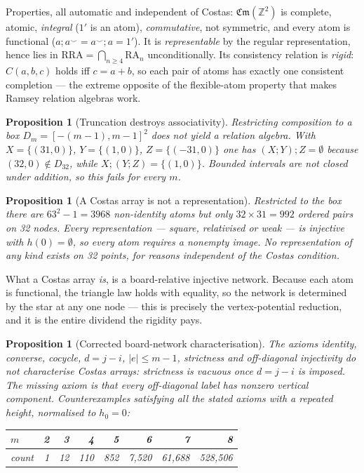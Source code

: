 \documentclass[11pt,a4paper]{article}
\newtheorem{proposition}[theorem]{Proposition}
\theoremstyle{definition}
\newcommand{\Z}{\mathbb{Z}}
\newcommand{\Cm}{\mathfrak{Cm}}
\newcommand{\RA}{\mathrm{RA}}
\newcommand{\RRA}{\mathrm{RRA}}
\begin{document}
Properties, all automatic and independent of Costas: $\Cm(\Z^2)$ is complete,
atomic, \emph{integral} ($1'$ is an atom), \emph{commutative}, not symmetric,
and every atom is functional ($a;a^\smile = a^\smile;a = 1'$). It is
\emph{representable} by the regular representation, hence lies in
$\RRA = \bigcap_{n\ge4}\RA_n$ unconditionally. Its consistency relation is
\emph{rigid}: $C(a,b,c)$ holds iff $c=a+b$, so each pair of atoms has exactly one
consistent completion --- the extreme opposite of the flexible-atom property that
makes Ramsey relation algebras work.

\begin{proposition}[Truncation destroys associativity]
Restricting composition to a box $D_m=[-(m-1),m-1]^2$ does not yield a relation
algebra. With $X=\{(31,0)\}$, $Y=\{(1,0)\}$, $Z=\{(-31,0)\}$ one has
$(X;Y);Z=\emptyset$ because $(32,0)\notin D_{32}$, while $X;(Y;Z)=\{(1,0)\}$.
Bounded intervals are not closed under addition, so this fails for every $m$.
\end{proposition}

\begin{proposition}[A Costas array is not a representation]
Restricted to the box there are $63^2-1 = 3968$ non-identity atoms but only
$32\times31 = 992$ ordered pairs on 32 nodes. Every representation --- square,
relativised or weak --- is injective with $h(0)=\emptyset$, so every atom
requires a nonempty image. No representation of any kind exists on 32 points,
for reasons independent of the Costas condition.
\end{proposition}

What a Costas array \emph{is}, is a board-relative injective network. Because
each atom is functional, the triangle law holds with equality, so the network is
determined by the star at any one node --- this is precisely the vertex-potential
reduction, and it is the entire dividend the rigidity pays.

\begin{proposition}[Corrected board-network characterisation]
\label{prop:board}
The axioms identity, converse, cocycle, $d=j-i$, $|e|\le m-1$, strictness and
off-diagonal injectivity do \emph{not} characterise Costas arrays: strictness is
vacuous once $d=j-i$ is imposed. The missing axiom is that every off-diagonal
label has \emph{nonzero vertical component}. Counterexamples satisfying all the
stated axioms with a repeated height, normalised to $h_0=0$:
\begin{center}
\begin{tabular}{@{}lrrrrrrr@{}}
\toprule
$m$ & 2 & 3 & 4 & 5 & 6 & 7 & 8 \\
\midrule
count & 1 & 12 & 110 & 852 & 7{,}520 & 61{,}688 & 528{,}506 \\
\bottomrule
\end{tabular}
\end{center}
\end{proposition}
\end{document}
